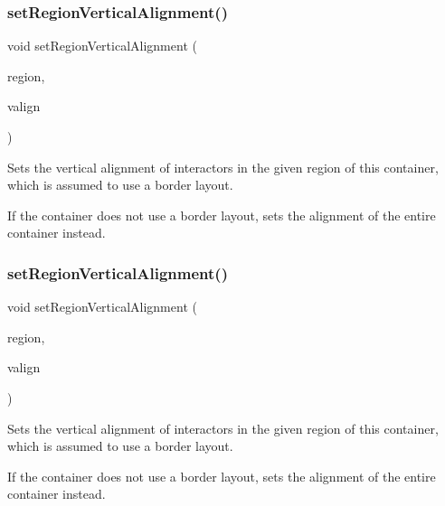 \subsubsection{\texorpdfstring{set\+Region\+Vertical\+Alignment()}{setRegionVerticalAlignment()}\hspace{0.1cm}{\footnotesize\ttfamily [1/2]}}
{\footnotesize\ttfamily void set\+Region\+Vertical\+Alignment (\begin{DoxyParamCaption}\item[{const std\+::string \&}]{region,  }\item[{const std\+::string \&}]{valign }\end{DoxyParamCaption})\hspace{0.3cm}{\ttfamily [virtual]}}



Sets the vertical alignment of interactors in the given region of this container, which is assumed to use a border layout. 

If the container does not use a border layout, sets the alignment of the entire container instead. \mbox{\label{classGContainer_a1efb2d3b67fb479aad27a6c0032ee70e}} 
\subsubsection{\texorpdfstring{set\+Region\+Vertical\+Alignment()}{setRegionVerticalAlignment()}\hspace{0.1cm}{\footnotesize\ttfamily [2/2]}}
{\footnotesize\ttfamily void set\+Region\+Vertical\+Alignment (\begin{DoxyParamCaption}\item[{\mbox{\hyperlink{classGContainer_a81a01a86de31071a92e6cce0bab9bc4b}{Region}}}]{region,  }\item[{Vertical\+Alignment}]{valign }\end{DoxyParamCaption})\hspace{0.3cm}{\ttfamily [virtual]}}



Sets the vertical alignment of interactors in the given region of this container, which is assumed to use a border layout. 

If the container does not use a border layout, sets the alignment of the entire container instead. \mbox{\label{classGInteractor_aca25d49481f9bf5fc8f7df4c086c4ce7}} 
